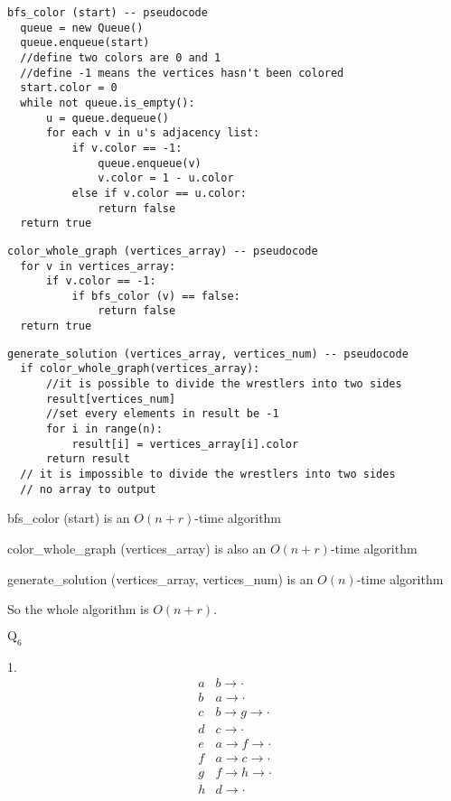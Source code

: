 \documentclass[12pt]{article}
\begin{document}
\begin{verbatim}
bfs_color (start) -- pseudocode
  queue = new Queue()
  queue.enqueue(start)
  //define two colors are 0 and 1
  //define -1 means the vertices hasn't been colored
  start.color = 0
  while not queue.is_empty():
      u = queue.dequeue()
      for each v in u's adjacency list:
          if v.color == -1:
              queue.enqueue(v)
              v.color = 1 - u.color
          else if v.color == u.color:
              return false
  return true
\end{verbatim}

\begin{verbatim}
color_whole_graph (vertices_array) -- pseudocode
  for v in vertices_array:
      if v.color == -1:
          if bfs_color (v) == false:
              return false
  return true
\end{verbatim}

\begin{verbatim}
generate_solution (vertices_array, vertices_num) -- pseudocode
  if color_whole_graph(vertices_array):
      //it is possible to divide the wrestlers into two sides
      result[vertices_num]
      //set every elements in result be -1
      for i in range(n):
          result[i] = vertices_array[i].color
      return result
  // it is impossible to divide the wrestlers into two sides
  // no array to output
\end{verbatim}

bfs\_color (start) is an $O(n + r)$-time algorithm

color\_whole\_graph (vertices\_array) is also an $O(n + r)$-time algorithm

generate\_solution (vertices\_array, vertices\_num) is an $O(n)$-time algorithm

So the whole algorithm is $O(n + r)$.

\newpage
$\text{Q}_{6}$

1.
\[
\begin{array}{c|l}
a & b \rightarrow \cdot \\
b & a \rightarrow \cdot \\
c & b \rightarrow g \rightarrow \cdot \\
d & c \rightarrow \cdot \\
e & a \rightarrow f \rightarrow \cdot \\
f & a \rightarrow c \rightarrow \cdot \\
g & f \rightarrow h \rightarrow \cdot \\
h & d \rightarrow \cdot \\
\end{array}
\]
\end{document}
